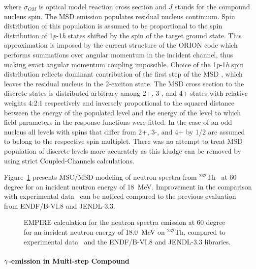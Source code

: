 \noindent where $\sigma_{OM}$ is optical model reaction cross section and $J$
stands for the compound nucleus spin. The MSD%
 emission populates residual nucleus continuum. Spin distribution
of this population is assumed to be proportional to the spin distribution of
1\emph{p}-1\emph{h} states shifted by the spin of the target ground state.
This approximation is imposed by the current structure of the ORION%
 code which performs summations over angular momentum in the
incident channel, thus making exact angular momentum coupling impossible.
Choice of the 1\emph{p}-1\emph{h} spin distribution reflects dominant
contribution of the first step of the MSD%
, which leaves the residual nucleus in the 2-exciton state. The
MSD%
 cross section to the discrete states is distributed arbitrary
among 2+, 3-, and 4+ states with relative weights 4:2:1 respectively and
inversely proportional to the squared distance between the energy of the
populated level and the energy of the level to which field parameters in the
response functions were fitted. In the case of an odd nucleus all levels
with spins that differ from 2+, 3-, and 4+ by 1/2 are assumed to belong to
the respective spin multiplet. There was no attempt to treat MSD%
 population of discrete levels more accurately as this kludge can
be removed by using strict Coupled-Channels calculations.

Figure~\ref{thoriumMSD} presents MSC/MSD modeling of neutron spectra from $%
^{232}$Th~\cite{crp} at 60 degree for an incident neutron energy of 18~MeV.
Improvement in the comparison with experimental data~\cite{mats} can be
noticed compared to the previous evaluation from ENDF/B-VI.8 and JENDL-3.3.
\begin{figure}[htbp]
\caption{EMPIRE calculation for the neutron spectra emission at 60 degree
for an incident neutron energy of 18.0~MeV on $^{232}$Th, compared to
experimental data~\protect\cite{mats} and the ENDF/B-VI.8 and JENDL-3.3
libraries.}
\label{thoriumMSD}
\end{figure}

\medskip

\paragraph{$\protect\gamma$-emission in Multi-step Compound}

